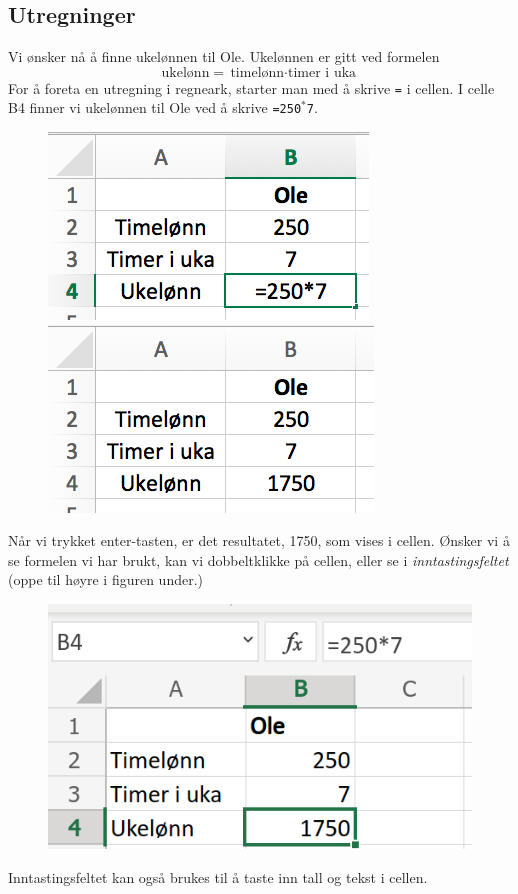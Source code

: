 \subsection{Utregninger}
Vi ønsker nå å finne ukelønnen til Ole.
Ukelønnen er gitt ved formelen
\[ \text{ukelønn}={\text{timelønn}\cdot \text{timer i uka}} \]
For å foreta en utregning i regneark, starter man med å skrive {\tt{=}} i cellen. I celle B4 finner vi ukelønnen til Ole ved å skrive {\tt=250$ ^* $7}.
\begin{figure}[H]
	\centering
	\includegraphics[scale=0.3]{figs/ex3}\qquad
	\includegraphics[scale=0.3]{figs/ex4}
\end{figure}
Når vi trykket enter-tasten, er det resultatet, 1750, som vises i cellen. Ønsker vi å se formelen vi har brukt, kan vi dobbeltklikke på cellen, eller se i \textit{inntastingsfeltet} (oppe til høyre i figuren under.)
\begin{figure}[H]
	\centering
	\includegraphics[scale=0.25]{figs/intast}
\end{figure}
\mer Inntastingsfeltet kan også brukes til å taste inn tall og tekst i cellen.

